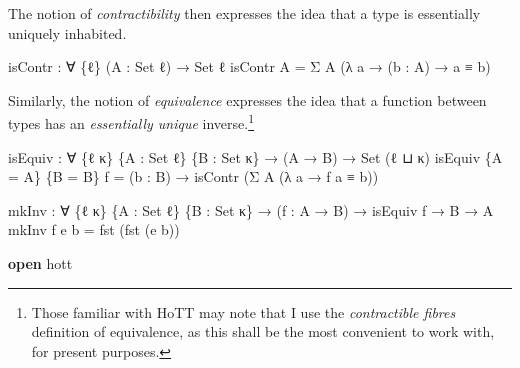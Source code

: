 \documentclass[
  12pt]{article}
\newenvironment{Shaded}{\begin{snugshade}}{\end{snugshade}}
\newcommand{\DataTypeTok}[1]{\textcolor[rgb]{0.00,0.34,0.68}{#1}}
\newcommand{\KeywordTok}[1]{\textcolor[rgb]{0.12,0.11,0.11}{\textbf{#1}}}
\newcommand{\NormalTok}[1]{\textcolor[rgb]{0.12,0.11,0.11}{#1}}
\newcommand{\OtherTok}[1]{\textcolor[rgb]{0.00,0.43,0.16}{#1}}
\begin{document}
The notion of \emph{contractibility} then expresses the idea that a type
is essentially uniquely inhabited.

\begin{Shaded}
\begin{Highlighting}[]
\NormalTok{    isContr }\OtherTok{:} \OtherTok{∀} \OtherTok{\{}\NormalTok{ℓ}\OtherTok{\}} \OtherTok{(}\NormalTok{A }\OtherTok{:} \DataTypeTok{Set}\NormalTok{ ℓ}\OtherTok{)} \OtherTok{→} \DataTypeTok{Set}\NormalTok{ ℓ}
\NormalTok{    isContr A }\OtherTok{=}\NormalTok{ Σ A }\OtherTok{(λ}\NormalTok{ a }\OtherTok{→} \OtherTok{(}\NormalTok{b }\OtherTok{:}\NormalTok{ A}\OtherTok{)} \OtherTok{→}\NormalTok{ a ≡ b}\OtherTok{)}
\end{Highlighting}
\end{Shaded}

Similarly, the notion of \emph{equivalence} expresses the idea that a
function between types has an \emph{essentially unique}
inverse.\footnote{Those familiar with HoTT may note that I use the
  \emph{contractible fibres} definition of equivalence, as this shall be
  the most convenient to work with, for present purposes.}

\begin{Shaded}
\begin{Highlighting}[]
\NormalTok{    isEquiv }\OtherTok{:} \OtherTok{∀} \OtherTok{\{}\NormalTok{ℓ κ}\OtherTok{\}} \OtherTok{\{}\NormalTok{A }\OtherTok{:} \DataTypeTok{Set}\NormalTok{ ℓ}\OtherTok{\}} \OtherTok{\{}\NormalTok{B }\OtherTok{:} \DataTypeTok{Set}\NormalTok{ κ}\OtherTok{\}} 
              \OtherTok{→} \OtherTok{(}\NormalTok{A }\OtherTok{→}\NormalTok{ B}\OtherTok{)} \OtherTok{→} \DataTypeTok{Set} \OtherTok{(}\NormalTok{ℓ ⊔ κ}\OtherTok{)}
\NormalTok{    isEquiv }\OtherTok{\{}\NormalTok{A }\OtherTok{=}\NormalTok{ A}\OtherTok{\}} \OtherTok{\{}\NormalTok{B }\OtherTok{=}\NormalTok{ B}\OtherTok{\}}\NormalTok{ f }\OtherTok{=} 
        \OtherTok{(}\NormalTok{b }\OtherTok{:}\NormalTok{ B}\OtherTok{)} \OtherTok{→}\NormalTok{ isContr }\OtherTok{(}\NormalTok{Σ A }\OtherTok{(λ}\NormalTok{ a }\OtherTok{→}\NormalTok{ f a ≡ b}\OtherTok{))}

\NormalTok{    mkInv }\OtherTok{:} \OtherTok{∀} \OtherTok{\{}\NormalTok{ℓ κ}\OtherTok{\}} \OtherTok{\{}\NormalTok{A }\OtherTok{:} \DataTypeTok{Set}\NormalTok{ ℓ}\OtherTok{\}} \OtherTok{\{}\NormalTok{B }\OtherTok{:} \DataTypeTok{Set}\NormalTok{ κ}\OtherTok{\}}
            \OtherTok{→} \OtherTok{(}\NormalTok{f }\OtherTok{:}\NormalTok{ A }\OtherTok{→}\NormalTok{ B}\OtherTok{)} \OtherTok{→}\NormalTok{ isEquiv f }\OtherTok{→}\NormalTok{ B }\OtherTok{→}\NormalTok{ A}
\NormalTok{    mkInv f e b }\OtherTok{=}\NormalTok{ fst }\OtherTok{(}\NormalTok{fst }\OtherTok{(}\NormalTok{e b}\OtherTok{))}

\KeywordTok{open}\NormalTok{ hott}
\end{Highlighting}
\end{Shaded}
\end{document}
